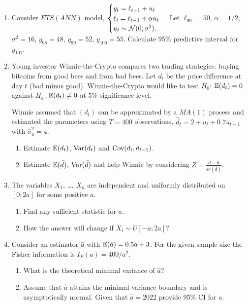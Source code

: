 \begin{enumerate}

\item Consider $ETS(ANN)$ model,
	$
	\begin{cases}
	y_t = \ell_{t-1} + u_t \\
	\ell_t = \ell_{t-1} + \alpha u_t \\
	u_t \sim \mathcal{N}(0;\sigma^2). \\
	\end{cases}
	$
Let $\ell_{99} = 50$, $\alpha = 1/2$, $\sigma^2 = 16$, $y_{98} = 48$, $y_{99} = 52$, $y_{100} = 55$. Calculate 95\% predictive interval for $y_{101}$.

\item Young investor Winnie-the-Crypto compares two trading strategies: buying bitcoins from good bees and from bad bees. 
Let $d_t$ be the price difference at day $t$ (bad minus good). 
Winnie-the-Crypto would like to test $H_0$: $\operatorname{\mathbb{E}}(d_t) = 0$ against $H_a$: $\operatorname{\mathbb{E}}(d_t) \neq 0$ at $5\%$ significance level.

Winnie assumed that $(d_t)$ can be approximated by a $MA(1)$ process and estimated the parameters using $T=400$ observations, $\hat d_t = 2 + u_t + 0.7 u_{t-1}$ 
with $\hat\sigma^2_u = 4$.

\begin{enumerate}
	\item Estimate $\operatorname{\mathbb{E}}(d_t)$, $\operatorname{Var}(d_t)$ and $\operatorname{Cov}(d_t, d_{t-1})$.
	\item Estimate $\operatorname{\mathbb{E}}(\bar d)$, $\operatorname{Var}(\bar d)$ and help Winnie by considering $Z = \frac{\bar d - 0}{se(\bar d)}$.
\end{enumerate}



\item The variables $X_1$, \ldots, $X_n$ are independent and uniformly distributed on $[0; 2a]$ for some positive $a$. 

\begin{enumerate}
	\item Find any sufficient statistic for $a$. 
	\item How the answer will change if $X_i \sim U[-a; 2a]$?
\end{enumerate}


\item Consider an estimator $\hat a$ with $\operatorname{\mathbb{E}}(\hat a) = 0.5a + 3$. For the given sample size the Fisher information is $I_F(a) = 400/a^2$.
\begin{enumerate}
	\item What is the theoretical minimal variance of $\hat a$?
	\item Assume that $\hat a$ attains the minimal variance boundary and is asymptotically normal. Given that $\hat a = 2022$ provide 95\% CI for $a$.
\end{enumerate}


\end{enumerate}
